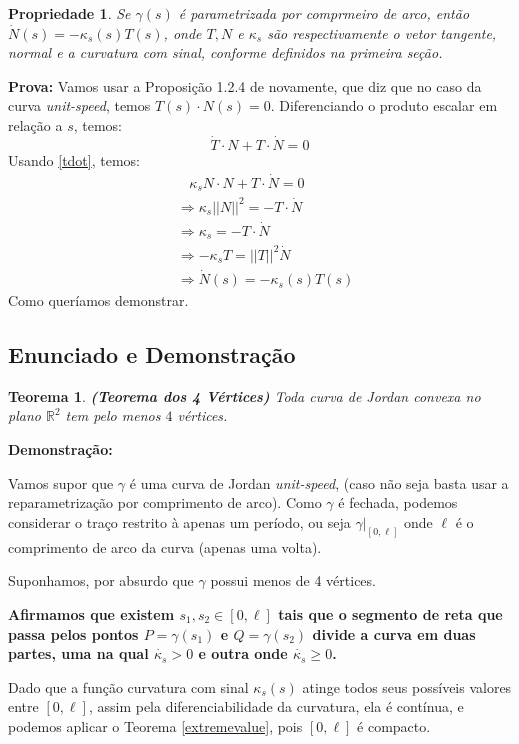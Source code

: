 \documentclass[12pt,letterpaper]{article}
\newtheorem{teo}{Teorema}
\newtheorem{prop}{Propriedade}
\newcommand{\rr}{\mathbb{R}^2}
\begin{document}
	\begin{prop}
		\label{prop} Se $\gamma(s)$ é parametrizada por comprmeiro de arco, então 
		$\dot N(s)=-\kappa_s(s)T(s)$, onde $T,N$ e $\kappa_s$ são respectivamente o vetor tangente, normal e a curvatura com sinal, conforme definidos na primeira seção.
	\end{prop} 
	
	\textbf{Prova:} Vamos usar a Proposição 1.2.4 de \cite{pressley2001elementary} novamente, que diz que no caso da curva \textit{unit-speed}, temos $T(s)\cdotp N(s)=0$. Diferenciando o produto escalar em relação a $s$, temos:
	$$\dot{T}\cdotp N+T\cdotp \dot{N}=0$$
	Usando \ref{tdot}, temos:
	\begin{align*}
		&~~~~\kappa_s N \cdotp N + T\cdotp \dot N=0\\
		&\Rightarrow\kappa_s||N||^2=-T\cdotp \dot N\\
		&\Rightarrow\kappa_s = -T\cdotp \dot N\\
		&\Rightarrow-\kappa_sT=||T||^2\dot N\\
		&\Rightarrow \dot N(s)=-\kappa_s(s)T(s)
	\end{align*}
	Como queríamos demonstrar.
	\subsection{Enunciado e Demonstração}
	\begin{teo}
		\textbf{(Teorema dos 4 Vértices)}
		\label{fvt}
		Toda curva de Jordan convexa no plano $\rr$ tem pelo menos $4$ vértices.
	\end{teo}

	\textbf{Demonstração:}
	
	Vamos supor que $\gamma$ é uma curva de Jordan \textit{unit-speed}, (caso não seja basta usar a reparametrização por comprimento de arco). Como $\gamma$ é fechada, podemos considerar o traço restrito à apenas um período, ou seja $\left.\gamma\right|_{[0,\ell]}$ onde $\ell$ é o comprimento de arco da curva (apenas uma volta).
	
	Suponhamos, por absurdo que $\gamma$ possui menos de 4 vértices. 
	
	\textbf{Afirmamos que existem $s_1,s_2\in [0,\ell]$ tais que o segmento de reta que passa pelos pontos $P=\gamma(s_1)$ e $Q=\gamma(s_2)$ divide a curva em duas partes, uma na qual $\dot{\kappa_s}>0$ e outra onde $\dot{\kappa_s}\geq0$.}
	
	Dado que a função curvatura com sinal $\kappa_s(s)$ atinge todos seus possíveis valores entre $[0,\ell]$, assim pela diferenciabilidade da curvatura, ela é contínua, e podemos aplicar o Teorema \ref{extremevalue}, pois $[0,\ell]$ é compacto.
	
\end{document}
